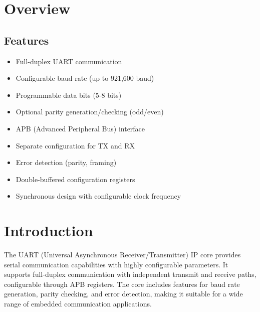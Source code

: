 \section{Overview}
\subsection{Features}
\begin{itemize}
    \item Full-duplex UART communication
    \item Configurable baud rate (up to 921,600 baud)
    \item Programmable data bits (5-8 bits)
    \item Optional parity generation/checking (odd/even)
    \item APB (Advanced Peripheral Bus) interface
    \item Separate configuration for TX and RX
    \item Error detection (parity, framing)
    \item Double-buffered configuration registers
    \item Synchronous design with configurable clock frequency
\end{itemize}

\section{Introduction}
The UART (Universal Asynchronous Receiver/Transmitter) IP core provides serial communication capabilities with highly configurable parameters. It supports full-duplex communication with independent transmit and receive paths, configurable through APB registers. The core includes features for baud rate generation, parity checking, and error detection, making it suitable for a wide range of embedded communication applications.